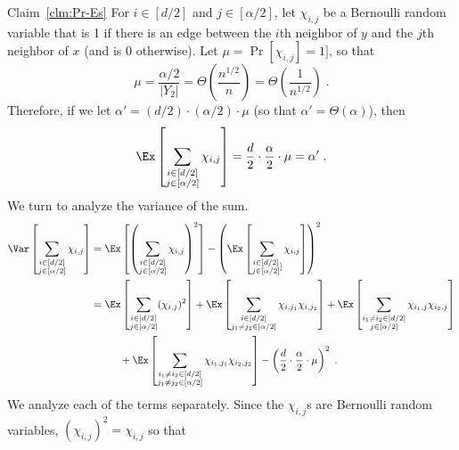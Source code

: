 \begin{proofof}{Claim~\ref{clm:Pr-Es}}
For $i\in [d/2]$  and $j \in [\alpha/2]$, let $\chi_{i,j}$ be a Bernoulli random variable that is 1 if there is an edge between the $i$th neighbor of $y$ and the $j$th neighbor of $x$ (and is 0 otherwise). Let  $\mu = \Pr[\chi_{i,j}]=1]$, so that
\begin{equation}
\mu = %
   \frac{\alpha/2}{|Y_2|} %
   = \Theta\left(\frac{n^{1/2}}{n}\right) = \Theta\left(\frac{1}{n^{1/2}}\right)\;.
\end{equation}
Therefore, if we let $\alpha' = (d/2)\cdot(\alpha/2)\cdot \mu$ (so that $\alpha' = \Theta(\alpha)$), then
\begin{equation}
\Ex\left[\sum_{\substack{i\in [d/2] \\ j\in [\alpha/2]}}\chi_{i,j}\right] = \frac{d}{2}\cdot\frac{\alpha}{2}\cdot \mu = \alpha'\;.
\end{equation}
We turn to analyze the variance of the sum.
\begin{align}
\Var\left[\sum_{\substack{i\in [d/2] \\ j\in [\alpha/2]}}\chi_{i,j}\right] & =
\Ex\left[\left(\sum_{\substack{i\in [d/2] \\ j\in [\alpha/2]}}\chi_{i,j}\right)^2\right] - \left(\Ex\left[\sum_{\substack{i\in [d/2] \\ j\in [\alpha/2]}]}\chi_{i,j}\right]\right)^2 \\
& =
\Ex\left[\sum_{\substack{i\in [d/2] \\ j\in [\alpha/2]}} (\chi_{i,j})^2\right] +
\Ex\left[\sum_{\substack{i\in [d/2] \\ j_1\neq j_2 \in [\alpha/2]}}\chi_{i,j_1}\chi_{i,j_2}\right]
+ \Ex\left[\sum_{\substack{i_1\neq i_2\in [d/2] \\ j\in  [\alpha/2]}}\chi_{i_1,j}\chi_{i_2,j}\right] \nonumber \\
&\;\;\;\;\;\;\;\;\;\;+ %
\Ex\left[\sum_{\substack{i_1\neq i_2\in [d/2] \\ j_1\neq j_2\in  [\alpha/2]}}\chi_{i_1,j_1}\chi_{i_2,j_2}\right] - \left(\frac{d}{2}\cdot\frac{\alpha}{2}\cdot \mu\right)^2 \;.
\label{eq:var-lb}
\end{align}
We analyze each of the terms separately.
Since the $\chi_{i,j}$s are Bernoulli random variables,
$(\chi_{i,j})^2 = \chi_{i,j}$ so that

\end{proofof}
